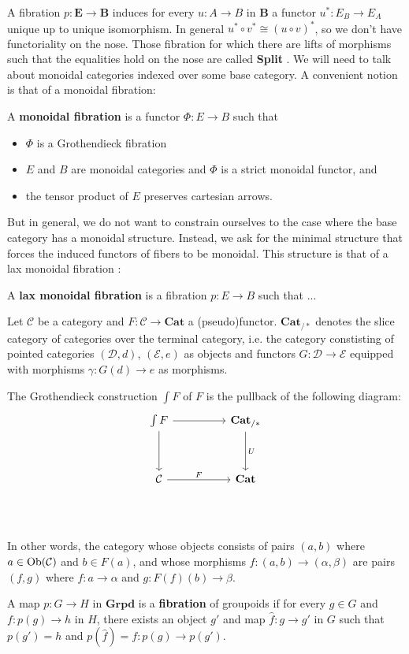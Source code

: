 A fibration $p : \mathbf{E} \to \mathbf{B}$ induces for every $u : A \to B$ in $\mathbf{B}$ a functor $u^*: E_B \to E_A$ unique up to unique isomorphism. In general $u^* \circ v^* \cong (u \circ v)^*$, so we don't have functoriality on the nose. Those fibration for which there are lifts of morphisms such that the equalities hold on the nose are called \textbf{Split }.
We will need to talk about monoidal categories indexed over some base category. A convenient notion is that of a monoidal fibration:
\begin{defn}
A \textbf{monoidal fibration} is a functor $\Phi\colon E\to B$ such that
\begin{itemize}
\item $\Phi$ is a Grothendieck fibration
\item $E$ and $B$ are monoidal categories and $\Phi$ is a strict monoidal functor, and
\item the tensor product of $E$ preserves cartesian arrows.
\end{itemize}
\end{defn}
But in general, we do not want to constrain ourselves to the case where the base category has a monoidal structure. Instead, we ask for the minimal structure that forces the induced functors of fibers to be monoidal. This structure is that of a lax monoidal fibration \cite{zawadowski}:
\begin{defn}
A \textbf{lax monoidal fibration} is a fibration $p : E \to B$ such that ...
\end{defn}
Let $\mathcal{C}$ be a category and $F : \mathcal{C} \to \mathbf{Cat}$ a (pseudo)functor. $\textbf{Cat}_{/*}$ denotes the slice category of categories over the terminal category, i.e. the category constisting of pointed categories $(\mathcal{D}, d)$, $(\mathcal{E}, e)$ as objects and functors $G : \mathcal{D} \to \mathcal{E}$ equipped with morphisms $\gamma : G(d) \to e$ as morphisms.
\begin{defn}
The Grothendieck construction $\int F$ of $F$ is the pullback of the following diagram:
\[
\ti
\int F \ar[r] \ar[d] & \textbf{Cat}_{/*} \ar[d, "U"] \\
\mathcal{C} \ar[r, "F"] & \textbf{Cat} \\
\kz
\]
\end{defn}
In other words, the category whose objects consists of pairs $(a, b)$ where $a \in \operatorname{\text{Ob}}(\mathcal{C})$ and $b \in F(a)$, and whose morphisms $f : (a, b) \to (\alpha, \beta)$ are pairs $(f, g)$ where $f: a \to \alpha$ and $g : F(f)(b) \to \beta$.
\begin{defn}
A map $p : G \to H$ in $\textbf{Grpd}$ is a \textbf{fibration} of groupoids if for every $g \in G$
and $f : p(g) \to h$ in $H$, there exists an object $g'$ and map $\hat f : g \to g'$ in $G$ such that $p(g') = h$ and $p(\hat f) = f : p(g) \to p(g')$.
\end{defn}
